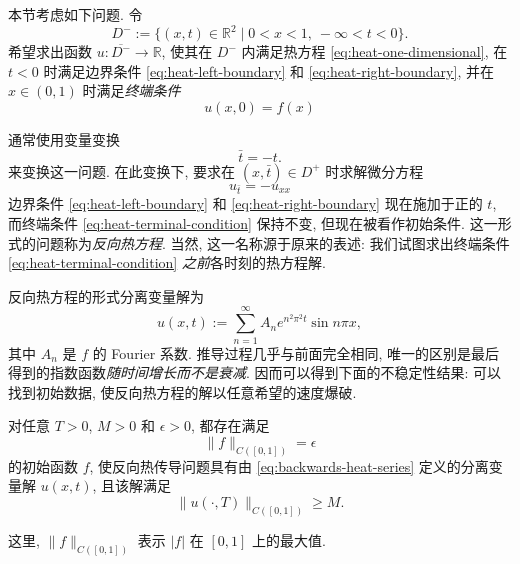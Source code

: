 本节考虑如下问题. 令
\[
D^-:=\{(x,t)\in\mathbb{R}^2\mid 0<x<1,\ -\infty<t<0\}.
\]
希望求出函数 $u:\overline{D^-}\to\mathbb{R}$, 使其在 $D^-$ 内满足热方程 \eqref{eq:heat-one-dimensional}, 在 $t<0$ 时满足边界条件 \eqref{eq:heat-left-boundary} 和 \eqref{eq:heat-right-boundary}, 并在 $x\in(0,1)$ 时满足\emph{终端条件}
\begin{equation}\label{eq:heat-terminal-condition}
u(x,0)=f(x)
\end{equation}


通常使用变量变换
\begin{equation}\label{eq:heat-time-reversal}
\bar t=-t.
\end{equation}
来变换这一问题. 在此变换下, 要求在 $(x,\bar t)\in D^+$ 时求解微分方程
\begin{equation}\label{eq:backwards-heat-equation}
u_{\bar t}=-u_{xx}
\end{equation}
边界条件 \eqref{eq:heat-left-boundary} 和 \eqref{eq:heat-right-boundary} 现在施加于正的 $t$, 而终端条件 \eqref{eq:heat-terminal-condition} 保持不变, 但现在被看作初始条件. 这一形式的问题称为\emph{反向热方程}. 当然, 这一名称源于原来的表述: 我们试图求出终端条件 \eqref{eq:heat-terminal-condition} \emph{之前}各时刻的热方程解.

反向热方程的形式分离变量解为
\begin{equation}\label{eq:backwards-heat-series}
u(x,t):=\sum_{n=1}^{\infty}A_ne^{n^2\pi^2t}\sin n\pi x,
\end{equation}
其中 $A_n$ 是 $f$ 的 Fourier 系数. 推导过程几乎与前面完全相同, 唯一的区别是最后得到的指数函数\emph{随时间增长而不是衰减}. 因而可以得到下面的不稳定性结果: 可以找到初始数据, 使反向热方程的解以任意希望的速度爆破.

\begin{Lemma}
\label{lem:backwards-heat-instability}
对任意 $T>0$, $M>0$ 和 $\epsilon>0$, 都存在满足
\begin{equation}\label{eq:backwards-small-initial-norm}
\|f\|_{C([0,1])}=\epsilon
\end{equation}
的初始函数 $f$, 使反向热传导问题具有由 \eqref{eq:backwards-heat-series} 定义的分离变量解 $u(x,t)$, 且该解满足
\begin{equation}\label{eq:backwards-large-terminal-norm}
\|u(\cdot,T)\|_{C([0,1])}\geq M.
\end{equation}

\end{Lemma}

这里, $\|f\|_{C([0,1])}$ 表示 $|f|$ 在 $[0,1]$ 上的最大值.

